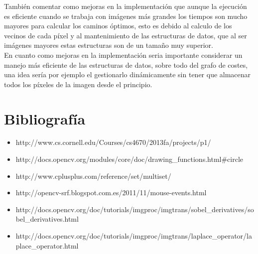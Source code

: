 También comentar como mejoras en la implementación que aunque la ejecución es eficiente cuando se trabaja con imágenes más grandes los tiempos son mucho mayores para calcular los caminos óptimos, esto es debido al calculo de los vecinos de cada píxel y al mantenimiento de las estructuras de datos, que al ser imágenes mayores estas estructuras son de un tamaño muy superior. \\

En cuanto como mejoras en la implementación seria importante considerar un manejo más eficiente de las estructuras de datos, sobre todo del grafo de costes, una idea sería por ejemplo el gestionarlo dinámicamente sin tener que almacenar todos los píxeles de la imagen desde el principio.\\

\section{Bibliografía}

\begin{itemize}

\item http://www.cs.cornell.edu/Courses/cs4670/2013fa/projects/p1/

\item http://docs.opencv.org/modules/core/doc/drawing_functions.html#circle

\item http://www.cplusplus.com/reference/set/multiset/

\item http://opencv-srf.blogspot.com.es/2011/11/mouse-events.html

\item http://docs.opencv.org/doc/tutorials/imgproc/imgtrans/sobel_derivatives/sobel_derivatives.html

\item http://docs.opencv.org/doc/tutorials/imgproc/imgtrans/laplace_operator/laplace_operator.html

\end{itemize}




